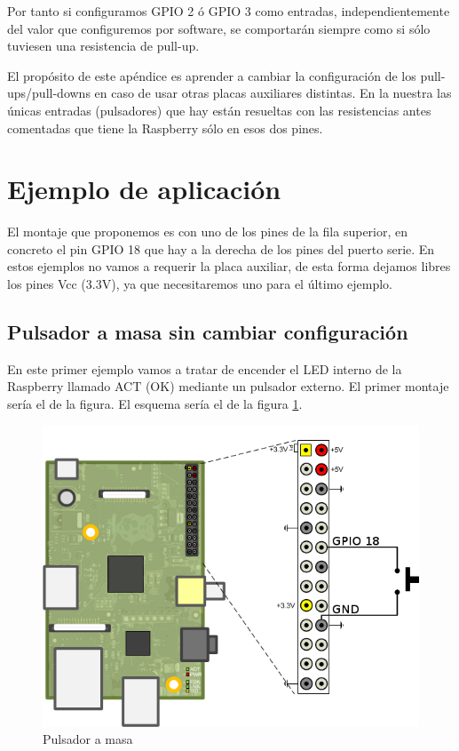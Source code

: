 Por tanto si configuramos GPIO 2 ó GPIO 3 como entradas, independientemente del valor
que configuremos por software, se comportarán siempre como si sólo tuviesen una
resistencia de pull-up.

El propósito de este apéndice es aprender a cambiar la configuración de los pull-ups/pull-downs
en caso de usar otras placas auxiliares distintas. En la nuestra las únicas entradas (pulsadores)
que hay están resueltas con las resistencias antes comentadas que tiene la Raspberry sólo en
esos dos pines.

\section{Ejemplo de aplicación}

El montaje que proponemos es con uno de los pines de la fila superior, en concreto el
pin GPIO 18 que hay a la derecha de los pines del puerto serie. En estos ejemplos
no vamos a requerir la placa auxiliar, de esta forma
dejamos libres los pines Vcc (3.3V), ya que necesitaremos uno para el último ejemplo. 

\subsection{Pulsador a masa sin cambiar configuración}

En este primer ejemplo vamos a tratar de encender el LED interno de la Raspberry llamado
ACT (OK) mediante un pulsador externo. El primer montaje sería el de
la figura. El esquema sería el de la figura \ref{fig:circuito1}.

\begin{figure}[h]
  \centering
    \includegraphics[width=14cm]{graphs/circuito1.png}
  \caption{Pulsador a masa}
  \label{fig:circuito1}
\end{figure}

